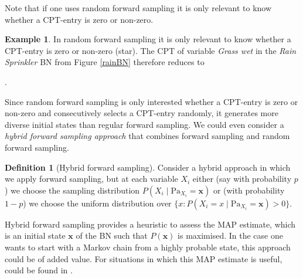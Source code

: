 \documentclass[a4paper, twoside, 11pt]{report}
\newcommand{\bfx}{{\mathbf{x}}}
\theoremstyle{plain}
\theoremstyle{definition}
\newtheorem{definition}[thm]{Definition}
\newtheorem{example}[thm]{Example}
\theoremstyle{remark}
\begin{document}
Note that if one uses random forward sampling it is only relevant to know whether a CPT-entry is zero or non-zero. 
\begin{example}
In random forward sampling it is only relevant to know whether a CPT-entry is zero or non-zero (\gls{star}). The CPT of variable \textit{Grass wet} in the \textit{Rain Sprinkler} BN from Figure \ref{rainBN} therefore reduces to  
\begin{table}[h!]
\centering
{}.
\caption{in order to select a CPT-entry, the random forward sampling approach is only interested whether an entry is zero or non-zero. Consecutively, from all $\star$ CPT-entries it selects one entry randomly.}
\label{block}
\end{table}
\end{example}
Since random forward sampling is only interested whether a CPT-entry is zero or non-zero and consecutively selects a CPT-entry randomly, it generates more diverse initial states than regular forward sampling. We could even consider a \textit{hybrid forward sampling approach} that combines {forward sampling} and {random forward sampling}.
\begin{definition}[Hybrid forward sampling]
Consider a hybrid approach in which we apply forward sampling, but at each variable $X_i$ either (say with probability $p$) we choose the sampling distribution $P(X_i \mid \text{Pa}_{X_i} = \mathbf{x})$ or (with probability $1-p$) we choose the uniform distribution over $\{x : P(X_i = x \mid \text{Pa}_{X_i}=\mathbf{x}) > 0\}$. 
\end{definition}
Hybrid forward sampling provides a heuristic to assess the \gls{MAP} estimate, which is an initial state $\bfx$ of the BN such that $P(\bfx)$ is maximised. In the case one wants to start with a Markov chain from a highly probable state, this approach could be of added value. For situations in which this MAP estimate is useful, could be found in \cite{park2002using}.
\end{document}
